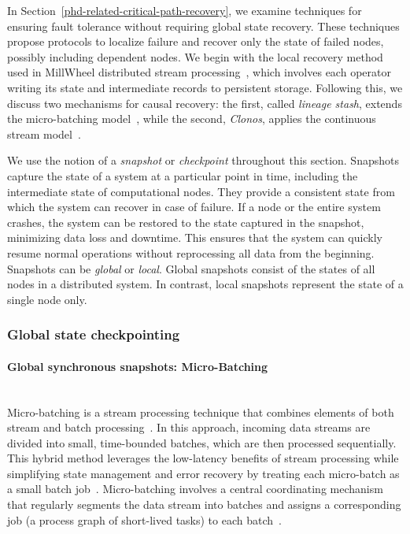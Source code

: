 In Section~\ref{phd-related-critical-path-recovery}, we examine techniques for ensuring fault tolerance without requiring global state recovery. These techniques propose protocols to localize failure and recover only the state of failed nodes, possibly including dependent nodes. We begin with the local recovery method used in MillWheel distributed stream processing~\cite{Akidau:2013:MFS:2536222.2536229}, which involves each operator writing its state and intermediate records to persistent storage. Following this, we discuss two mechanisms for causal recovery: the first, called {\em lineage stash}, extends the micro-batching model~\cite{Wang:2019:LSF:3341301.3359653}, while the second, {\em Clonos}, applies the continuous stream model~\cite{silvestre2021clonos}.

We use the notion of a {\em snapshot} or {\em checkpoint} throughout this section. Snapshots capture the state of a system at a particular point in time, including the intermediate state of computational nodes. They provide a consistent state from which the system can recover in case of failure. If a node or the entire system crashes, the system can be restored to the state captured in the snapshot, minimizing data loss and downtime. This ensures that the system can quickly resume normal operations without reprocessing all data from the beginning. Snapshots can be {\em global} or {\em local}. Global snapshots consist of the states of all nodes in a distributed system. In contrast, local snapshots represent the state of a single node only.

\subsubsection{Global state checkpointing}
\label{phd-related-global-state-checkpointing}

\paragraph{Global synchronous snapshots: Micro-Batching} \mbox{} \\

Micro-batching is a stream processing technique that combines elements of both stream and batch processing~\cite{Zaharia:2012:DSE:2342763.2342773, zaharia2010spark}. In this approach, incoming data streams are divided into small, time-bounded batches, which are then processed sequentially. This hybrid method leverages the low-latency benefits of stream processing while simplifying state management and error recovery by treating each micro-batch as a small batch job~\cite{garcia2023micro}. Micro-batching involves a central coordinating mechanism that regularly segments the data stream into batches and assigns a corresponding job (a process graph of short-lived tasks) to each batch~\cite{Zaharia:2012:DSE:2342763.2342773}.

